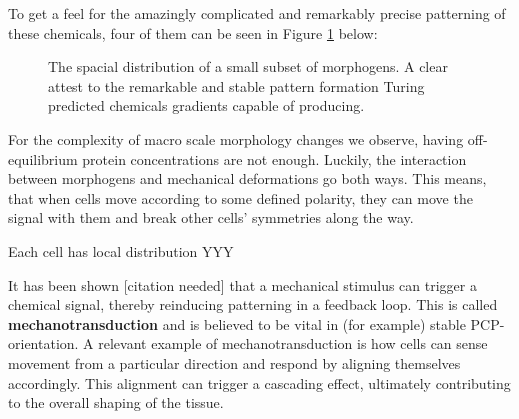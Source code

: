 To get a feel for the amazingly complicated and remarkably precise patterning of these chemicals, four of them can be seen in Figure \ref{fig:MorphogenMap} below:


\noindent

\begin{figure}[H]
    \centering
    \caption{The spacial distribution of a small subset of morphogens. A clear attest to the remarkable and stable pattern formation Turing predicted chemicals gradients capable of producing.}
    \label{fig:MorphogenMap}
\end{figure}





For the complexity of macro scale morphology changes we observe, having off-equilibrium protein concentrations are not enough.  Luckily, the interaction between morphogens and mechanical deformations go both ways. This means, that when cells move according to some defined polarity, they can move the signal with them and break other cells' symmetries along the way. 

Each cell has local distribution YYY 

It has been shown [citation needed] that a mechanical stimulus can trigger a chemical signal, thereby reinducing patterning in a feedback loop. This is called \textbf{mechanotransduction} and is believed to be vital in (for example) stable PCP-orientation. A relevant example of mechanotransduction is how cells can sense movement from a particular direction and respond by aligning themselves accordingly. This alignment can trigger a cascading effect, ultimately contributing to the overall shaping of the tissue.\\


